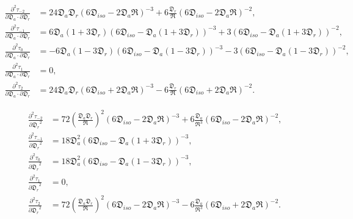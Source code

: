 \documentclass[a4paper,11pt,twoside,openright]{book}
\def\lthtmlcheckvsize{\ifdim\ht\sizebox<\vsize 
  \ifdim\wd\sizebox<\hsize\expandafter\hfill\fi \expandafter\vfill
  \else\expandafter\vss\fi}%
\begin{document}
{\newpage\clearpage
\setcounter{equation}{144}
%
\begin{subequations}\begin{align}
\frac{\partial^2 \tau_{-2}}{\partial \mathfrak{D}_a \cdot \partial \mathfrak{D}_r} &= 24 \mathfrak{D}_a \mathfrak{D}_r (6\mathfrak{D}_{iso} - 2\mathfrak{D}_a\mathfrak{R})^{-3}
+ 6 \frac{\mathfrak{D}_r}{\mathfrak{R}} (6\mathfrak{D}_{iso} - 2\mathfrak{D}_a\mathfrak{R})^{-2}, \\
\frac{\partial^2 \tau_{-1}}{\partial \mathfrak{D}_a \cdot \partial \mathfrak{D}_r} &= 6\mathfrak{D}_a(1 + 3\mathfrak{D}_r) (6\mathfrak{D}_{iso} - \mathfrak{D}_a (1 + 3\mathfrak{D}_r))^{-3}
+ 3 (6\mathfrak{D}_{iso} - \mathfrak{D}_a (1 + 3\mathfrak{D}_r))^{-2}, \\
\frac{\partial^2 \tau_{0}}{\partial \mathfrak{D}_a \cdot \partial \mathfrak{D}_r}  &= -6\mathfrak{D}_a(1 - 3\mathfrak{D}_r) (6\mathfrak{D}_{iso} - \mathfrak{D}_a (1 - 3\mathfrak{D}_r))^{-3}
- 3 (6\mathfrak{D}_{iso} - \mathfrak{D}_a (1 - 3\mathfrak{D}_r))^{-2}, \\
\frac{\partial^2 \tau_{1}}{\partial \mathfrak{D}_a \cdot \partial \mathfrak{D}_r}  &= 0, \\
\frac{\partial^2 \tau_{2}}{\partial \mathfrak{D}_a \cdot \partial \mathfrak{D}_r}  &= 24 \mathfrak{D}_a \mathfrak{D}_r (6\mathfrak{D}_{iso} + 2\mathfrak{D}_a\mathfrak{R})^{-3}
- 6 \frac{\mathfrak{D}_r}{\mathfrak{R}} (6\mathfrak{D}_{iso} + 2\mathfrak{D}_a\mathfrak{R})^{-2}.
\end{align}\end{subequations}%
\lthtmldisplayZ
\lthtmlcheckvsize\clearpage}

{\newpage\clearpage
\setcounter{equation}{145}
%
\begin{subequations}\begin{align}
\frac{\partial^2 \tau_{-2}}{{\partial \mathfrak{D}_r}^2} &=
72 \left( \frac{\mathfrak{D}_a \mathfrak{D}_r}{\mathfrak{R}} \right)^2 (6\mathfrak{D}_{iso} - 2\mathfrak{D}_a\mathfrak{R})^{-3}
+ 6 \frac{\mathfrak{D}_a}{\mathfrak{R}^3} (6\mathfrak{D}_{iso} - 2\mathfrak{D}_a\mathfrak{R})^{-2}, \\
\frac{\partial^2 \tau_{-1}}{{\partial \mathfrak{D}_r}^2} &= 18\mathfrak{D}_a^2 (6\mathfrak{D}_{iso} - \mathfrak{D}_a (1 + 3\mathfrak{D}_r))^{-3}, \\
\frac{\partial^2 \tau_{0}}{{\partial \mathfrak{D}_r}^2}  &= 18\mathfrak{D}_a^2 (6\mathfrak{D}_{iso} - \mathfrak{D}_a (1 - 3\mathfrak{D}_r))^{-3}, \\
\frac{\partial^2 \tau_{1}}{{\partial \mathfrak{D}_r}^2}  &= 0, \\
\frac{\partial^2 \tau_{2}}{{\partial \mathfrak{D}_r}^2}  &=
72 \left( \frac{\mathfrak{D}_a \mathfrak{D}_r}{\mathfrak{R}} \right)^2 (6\mathfrak{D}_{iso} - 2\mathfrak{D}_a\mathfrak{R})^{-3}
- 6 \frac{\mathfrak{D}_a}{\mathfrak{R}^3} (6\mathfrak{D}_{iso} + 2\mathfrak{D}_a\mathfrak{R})^{-2}.
\end{align}\end{subequations}%
\lthtmldisplayZ
\lthtmlcheckvsize\clearpage}
\end{document}
